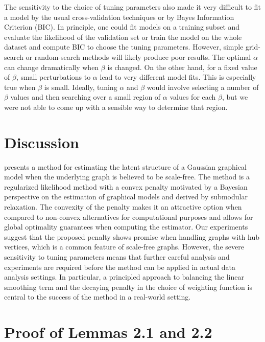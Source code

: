 \documentclass{uwstat572}
\theoremstyle{remark}
\theoremstyle{definition}
\begin{document}
The sensitivity to the choice of tuning parameters also made it very difficult to fit a model by the usual cross-validation techniques or by Bayes Information Criterion (BIC).  In principle, one could fit models on a training subset and evaluate the likelihood of the validation set or train the model on the whole dataset and compute BIC to choose the tuning parameters.  However, simple grid-search or random-search methods will likely produce poor results.  The optimal $\alpha$ can change dramatically when $\beta$ is changed.  On the other hand, for a fixed value of $\beta$, small perturbations to $\alpha$ lead to very different model fits. This is especially true when $\beta$ is small.  Ideally, tuning $\alpha$ and $\beta$ would involve selecting a number of $\beta$ values and then searching over a small region of $\alpha$ values for each $\beta$, but we were not able to come up with a sensible way to determine that region.


\section{Discussion}

\cite{Defazio2012} presents a method for estimating the latent structure of a Gaussian graphical model when the underlying graph is believed to be scale-free.  The method is a regularized likelihood method with a convex penalty motivated by a Bayesian perspective on the estimation of graphical models and derived by submodular relaxation.  The convexity of the penalty makes it an attractive option when compared to non-convex alternatives for computational purposes and allows for global optimality guarantees when computing the estimator. Our experiments suggest that the proposed penalty shows promise when handling graphs with hub vertices, which is a common feature of scale-free graphs.  However, the severe sensitivity to tuning parameters means that further careful analysis and experiments are required before the method can be applied in actual data analysis settings.  In particular, a principled approach to balancing the linear smoothing term and the decaying penalty in the choice of weighting function is central to the success of the method in a real-world setting.




\appendix

\section{Proof of Lemmas 2.1 and 2.2}
\end{document}
